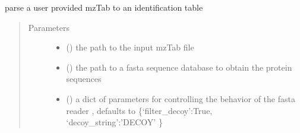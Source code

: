 \documentclass[letterpaper,10pt,english]{sphinxmanual}
\begin{document}

\begin{fulllineitems}
\label{\detokenize{IPTK.IO:IPTK.IO.InFunctions.parse_mzTab_to_identification_table}}
parse a user provided mzTab to an identification table
\begin{quote}\begin{description}
\item[{Parameters}] \leavevmode\begin{itemize}
\item {} 
 () \textendash{} the path to the input mzTab file

\item {} 
 () \textendash{} the path to a fasta sequence database to obtain the protein sequences

\item {} 
 (\sphinxstyleliteralemphasis{\sphinxupquote{{[}}}\sphinxstyleliteralemphasis{\sphinxupquote{,}}\sphinxstyleliteralemphasis{\sphinxupquote{{]}}}\sphinxstyleliteralemphasis{\sphinxupquote{, }}) \textendash{} a dict of parameters for controlling the behavior of the fasta reader , defaults to \{‘filter\_decoy’:True, ‘decoy\_string’:’DECOY’ \}

\end{itemize}


\end{description}
\end{quote}
\end{fulllineitems}
\end{document}
